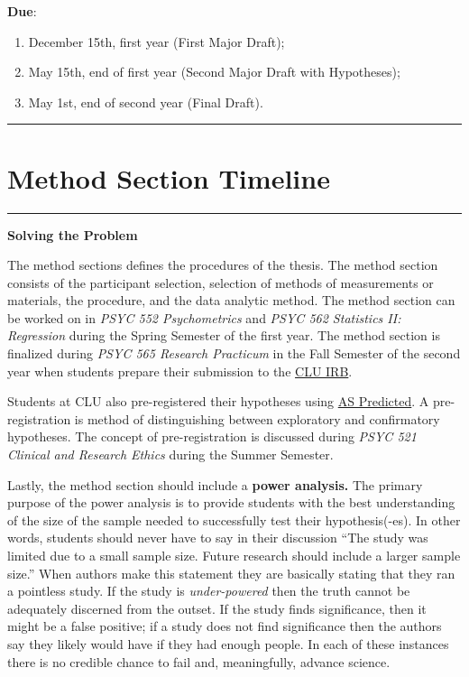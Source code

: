 \documentclass[openany]{book}
\providecommand{\tightlist}{%
  \setlength{\itemsep}{0pt}\setlength{\parskip}{0pt}}
\begin{document}
\textbf{Due}:

\begin{enumerate}
\def\labelenumi{\arabic{enumi}.}
\tightlist
\item
  December 15th, first year (First Major Draft);
\item
  May 15th, end of first year (Second Major Draft with Hypotheses);
\item
  May 1st, end of second year (Final Draft).
\end{enumerate}

\begin{center}\rule{0.5\linewidth}{0.5pt}\end{center}

\hypertarget{method}{%
\section{Method Section Timeline}\label{method}}

\begin{center}\rule{0.5\linewidth}{0.5pt}\end{center}

\textbf{Solving the Problem}

The method sections defines the procedures of the thesis. The method section consists of the participant selection, selection of methods of measurements or materials, the procedure, and the data analytic method. The method section can be worked on in \emph{PSYC 552 Psychometrics} and \emph{PSYC 562 Statistics II: Regression} during the Spring Semester of the first year. The method section is finalized during \emph{PSYC 565 Research Practicum} in the Fall Semester of the second year when students prepare their submission to the \href{https://www.callutheran.edu/research/irb/}{CLU IRB}.

Students at CLU also pre-registered their hypotheses using \href{https://aspredicted.org/}{AS Predicted}. A pre-registration is method of distinguishing between exploratory and confirmatory hypotheses. The concept of pre-registration is discussed during \emph{PSYC 521 Clinical and Research Ethics} during the Summer Semester.

Lastly, the method section should include a \textbf{power analysis.} The primary purpose of the power analysis is to provide students with the best understanding of the size of the sample needed to successfully test their hypothesis(-es). In other words, students should never have to say in their discussion ``The study was limited due to a small sample size. Future research should include a larger sample size.'' When authors make this statement they are basically stating that they ran a pointless study. If the study is \emph{under-powered} then the truth cannot be adequately discerned from the outset. If the study finds significance, then it might be a false positive; if a study does not find significance then the authors say they likely would have if they had enough people. In each of these instances there is no credible chance to fail and, meaningfully, advance science.
\end{document}
